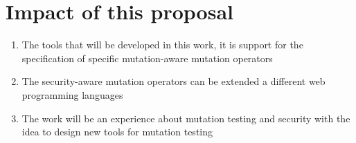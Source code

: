 \section{Impact of this proposal}

\begin{enumerate}
    \item The tools that will be developed in this work, it is support for the specification of specific mutation-aware mutation operators
    \item The security-aware mutation operators can be extended a different web programming languages
    \item The work will be an experience about mutation testing and security with the idea to design new tools for mutation testing
\end{enumerate}
